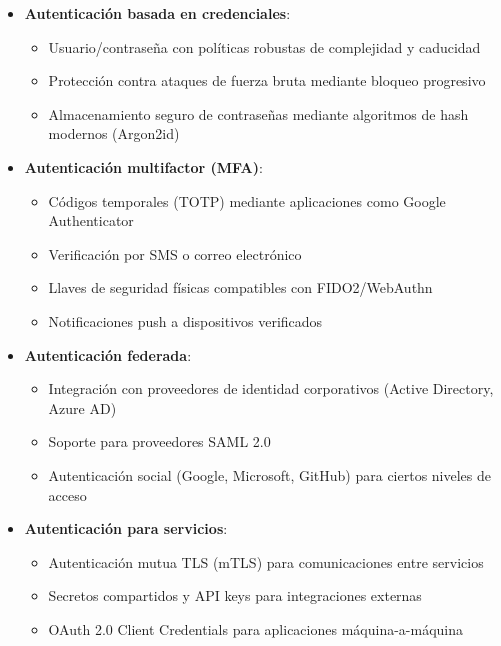 \documentclass[12pt,a4paper]{article}
\begin{document}
\begin{itemize}
    \item \textbf{Autenticación basada en credenciales}:
    \begin{itemize}
        \item Usuario/contraseña con políticas robustas de complejidad y caducidad
        \item Protección contra ataques de fuerza bruta mediante bloqueo progresivo
        \item Almacenamiento seguro de contraseñas mediante algoritmos de hash modernos (Argon2id)
    \end{itemize}
    
    \item \textbf{Autenticación multifactor (MFA)}:
    \begin{itemize}
        \item Códigos temporales (TOTP) mediante aplicaciones como Google Authenticator
        \item Verificación por SMS o correo electrónico
        \item Llaves de seguridad físicas compatibles con FIDO2/WebAuthn
        \item Notificaciones push a dispositivos verificados
    \end{itemize}
    
    \item \textbf{Autenticación federada}:
    \begin{itemize}
        \item Integración con proveedores de identidad corporativos (Active Directory, Azure AD)
        \item Soporte para proveedores SAML 2.0
        \item Autenticación social (Google, Microsoft, GitHub) para ciertos niveles de acceso
    \end{itemize}
    
    \item \textbf{Autenticación para servicios}:
    \begin{itemize}
        \item Autenticación mutua TLS (mTLS) para comunicaciones entre servicios
        \item Secretos compartidos y API keys para integraciones externas
        \item OAuth 2.0 Client Credentials para aplicaciones máquina-a-máquina
    \end{itemize}
\end{itemize}
\end{document}
